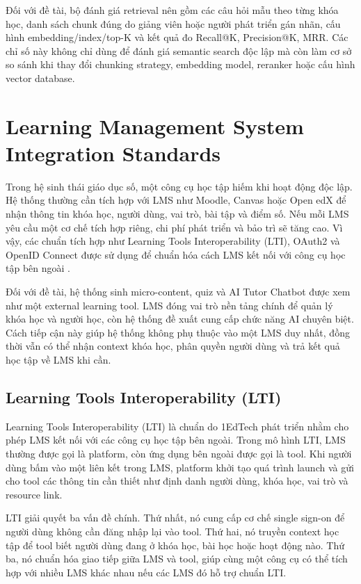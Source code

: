 Đối với đề tài, bộ đánh giá retrieval nên gồm các câu hỏi mẫu theo từng khóa
học, danh sách chunk đúng do giảng viên hoặc người phát triển gán nhãn, cấu
hình embedding/index/top-K và kết quả đo Recall@K, Precision@K, MRR. Các chỉ số
này không chỉ dùng để đánh giá semantic search độc lập mà còn làm cơ sở so sánh
khi thay đổi chunking strategy, embedding model, reranker hoặc cấu hình vector
database.

\section{Learning Management System Integration Standards}
\label{sec:lms-integration-standards}

Trong hệ sinh thái giáo dục số, một công cụ học tập hiếm khi hoạt động độc lập.
Hệ thống thường cần tích hợp với LMS như Moodle, Canvas hoặc Open edX để nhận
thông tin khóa học, người dùng, vai trò, bài tập và điểm số. Nếu mỗi LMS yêu cầu
một cơ chế tích hợp riêng, chi phí phát triển và bảo trì sẽ tăng cao. Vì vậy,
các chuẩn tích hợp như Learning Tools Interoperability (LTI), OAuth2 và OpenID
Connect được sử dụng để chuẩn hóa cách LMS kết nối với công cụ học tập bên ngoài
\cite{lti-advantage,openedx-lti}.

Đối với đề tài, hệ thống sinh micro-content, quiz và AI Tutor Chatbot được xem
như một external learning tool. LMS đóng vai trò nền tảng chính để quản lý khóa
học và người học, còn hệ thống đề xuất cung cấp chức năng AI chuyên biệt. Cách
tiếp cận này giúp hệ thống không phụ thuộc vào một LMS duy nhất, đồng thời vẫn
có thể nhận context khóa học, phân quyền người dùng và trả kết quả học tập về
LMS khi cần.

\subsection{Learning Tools Interoperability (LTI)}
\label{subsec:lti}

Learning Tools Interoperability (LTI) là chuẩn do 1EdTech phát triển nhằm cho
phép LMS kết nối với các công cụ học tập bên ngoài. Trong mô hình LTI, LMS
thường được gọi là platform, còn ứng dụng bên ngoài được gọi là tool. Khi người
dùng bấm vào một liên kết trong LMS, platform khởi tạo quá trình launch và gửi
cho tool các thông tin cần thiết như định danh người dùng, khóa học, vai trò và
resource link.

LTI giải quyết ba vấn đề chính. Thứ nhất, nó cung cấp cơ chế single sign-on để
người dùng không cần đăng nhập lại vào tool. Thứ hai, nó truyền context học tập
để tool biết người dùng đang ở khóa học, bài học hoặc hoạt động nào. Thứ ba, nó
chuẩn hóa giao tiếp giữa LMS và tool, giúp cùng một công cụ có thể tích hợp với
nhiều LMS khác nhau nếu các LMS đó hỗ trợ chuẩn LTI.

